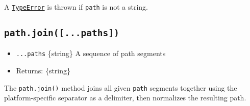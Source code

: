 \begin{Shaded}
\begin{Highlighting}[]
\NormalTok{(}\NormalTok{)}\OperatorTok{;}    
\NormalTok{(}\StringTok{\textquotesingle{}}\SpecialCharTok{\textbackslash{}\textbackslash{}\textbackslash{}\textbackslash{}}\NormalTok{)}\OperatorTok{;}  
\NormalTok{(}\NormalTok{)}\OperatorTok{;}   
\NormalTok{(}\SpecialCharTok{\textbackslash{}\textbackslash{}}\SpecialCharTok{\textbackslash{}\textbackslash{}}\NormalTok{)}\OperatorTok{;} 
\NormalTok{(}\SpecialCharTok{\textbackslash{}\textbackslash{}}\NormalTok{)}\OperatorTok{;}    
\NormalTok{(}\NormalTok{)}\OperatorTok{;}     
\NormalTok{(}\NormalTok{)}\OperatorTok{;}           
\end{Highlighting}
\end{Shaded}

A \href{errors.md\#class-typeerror}{\texttt{TypeError}} is thrown if
\texttt{path} is not a string.

\subsection{\texorpdfstring{\texttt{path.join({[}...paths{]})}}{path.join({[}...paths{]})}}\label{path.join...paths}

\begin{itemize}
\tightlist
\item
  \texttt{...paths} \{string\} A sequence of path segments
\item
  Returns: \{string\}
\end{itemize}

The \texttt{path.join()} method joins all given \texttt{path} segments
together using the platform-specific separator as a delimiter, then
normalizes the resulting path.

